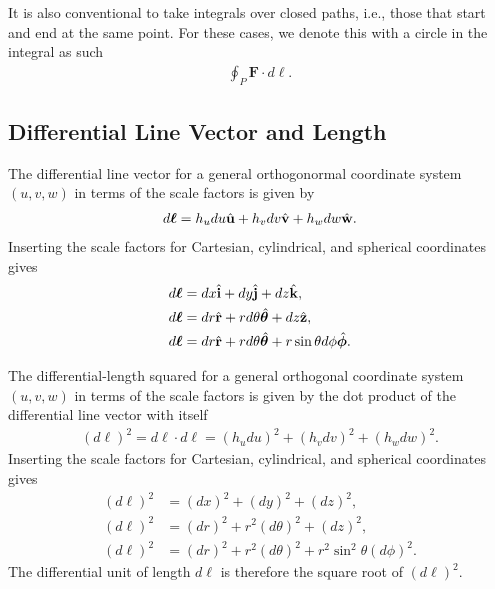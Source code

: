 It is also conventional to take integrals over closed paths, i.e., those that start and end at the same point. For these cases, we denote this with a circle in the integral as such
\begin{align}
  \oint_P \mathbf{F} \cdot d\boldsymbol\ell .
\end{align}


\subsection{Differential Line Vector and Length}

The differential line vector for a general orthogonormal coordinate system $(u,v,w)$ in terms of the scale factors is given by
\begin{align}
  d\boldsymbol\ell =   h_u du \hat{\mathbf{u}} + h_v dv \hat{\mathbf{v}} + h_w dw \hat{\mathbf{w}}.
\end{align}
Inserting the scale factors for Cartesian, cylindrical, and spherical coordinates gives
\begin{subequations}
\begin{align}
  d\boldsymbol\ell &= dx \hat{\mathbf{i}} + dy \hat{\mathbf{j}} + dz \hat{\mathbf{k}} , \\
  d\boldsymbol\ell &= dr \hat{\mathbf{r}} + r d\theta \hat{\boldsymbol\theta} + dz \hat{\mathbf{z}} , \\
  d\boldsymbol\ell &= dr \hat{\mathbf{r}} + r d\theta \hat{\boldsymbol\theta} + r \sin \theta d\phi \hat{\boldsymbol\phi} .
\end{align}
\end{subequations}

The differential-length squared for a general orthogonal coordinate system $(u,v,w)$ in terms of the scale factors is given by the dot product of the differential line vector with itself
\begin{align}
  ( d\ell )^2 = d\boldsymbol\ell \cdot d\boldsymbol\ell = ( h_u du )^2 + ( h_v dv )^2 + ( h_w dw )^2 .
\end{align}
Inserting the scale factors for Cartesian, cylindrical, and spherical coordinates gives
\begin{subequations}
\begin{align}
  ( d\ell )^2 &= ( dx )^2 + ( dy )^2 + ( dz )^2, \\
  ( d\ell )^2 &= ( dr )^2 + r^2 ( d\theta )^2 + ( dz )^2, \\
  ( d\ell )^2 &= ( dr )^2 + r^2 ( d\theta )^2 + r^2 \sin^2 \theta ( d\phi )^2 .
\end{align}
\end{subequations}
The differential unit of length $d\ell$ is therefore the square root of $(d\ell)^2$.


